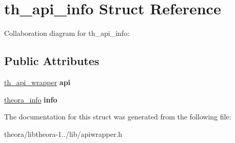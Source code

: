 \hypertarget{structth__api__info}{\section{th\+\_\+api\+\_\+info Struct Reference}
\label{structth__api__info}
}


Collaboration diagram for th\+\_\+api\+\_\+info\+:
\subsection*{Public Attributes}
\begin{DoxyCompactItemize}
\item 
\hypertarget{structth__api__info_aee065aad0f5beaf5f8214a6b9fe9f611}{\hyperlink{structth__api__wrapper}{th\+\_\+api\+\_\+wrapper} {\bfseries api}}\label{structth__api__info_aee065aad0f5beaf5f8214a6b9fe9f611}

\item 
\hypertarget{structth__api__info_a9de3be7013e3c0a7ef7f625f9d74bc40}{\hyperlink{structtheora__info}{theora\+\_\+info} {\bfseries info}}\label{structth__api__info_a9de3be7013e3c0a7ef7f625f9d74bc40}

\end{DoxyCompactItemize}


The documentation for this struct was generated from the following file\+:\begin{DoxyCompactItemize}
\item 
theora/libtheora-\/1../lib/apiwrapper.\+h\end{DoxyCompactItemize}
